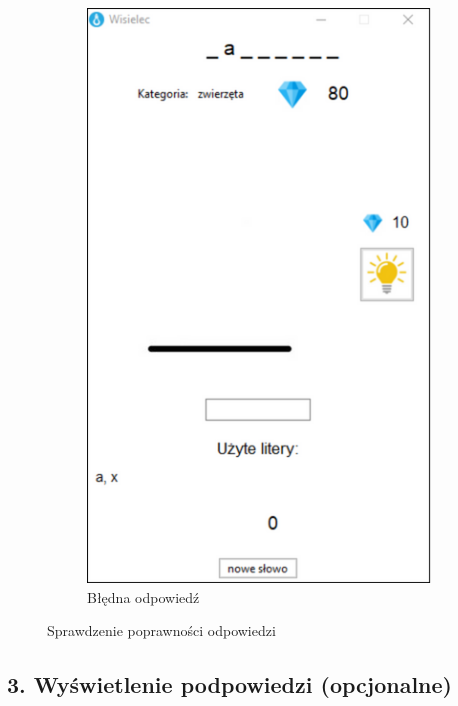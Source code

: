 \documentclass[]{report}
\begin{document}
\begin{figure}[h]
\begin{subfigure}{0.4\textwidth}
			\includegraphics[width=\linewidth]{6}
			\caption{Błędna odpowiedź}
			\label{fig:bledna_odpowiedz}
		\end{subfigure}
	\caption{Sprawdzenie poprawności odpowiedzi}
	\label{fig:Poprawnosc_odpowiedzi}
\end{figure}

\newpage

\subsection*{3. Wyświetlenie podpowiedzi (opcjonalne)}
\end{document}
